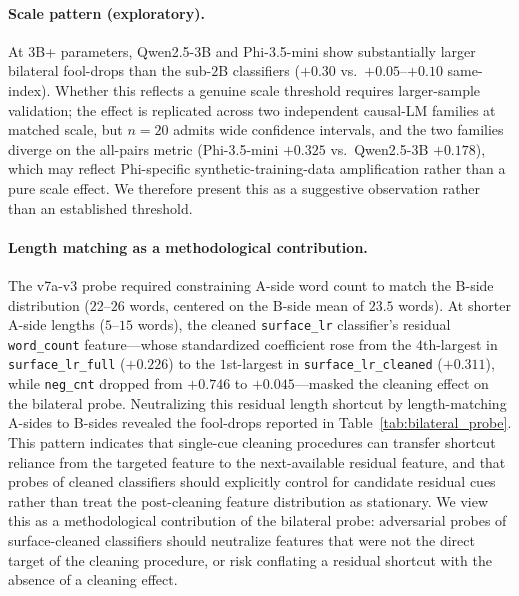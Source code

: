 \paragraph{Scale pattern (exploratory).} At $3$B+ parameters,
Qwen2.5-3B and Phi-3.5-mini show substantially larger bilateral
fool-drops than the sub-$2$B classifiers ($+0.30$ vs.\ $+0.05$--$+0.10$
same-index). Whether this reflects a genuine scale threshold requires
larger-sample validation; the effect is replicated across two
independent causal-LM families at matched scale, but $n=20$ admits
wide confidence intervals, and the two families diverge on the
all-pairs metric (Phi-3.5-mini $+0.325$ vs.\ Qwen2.5-3B $+0.178$),
which may reflect Phi-specific synthetic-training-data amplification
rather than a pure scale effect. We therefore present this as a
suggestive observation rather than an established threshold.

\paragraph{Length matching as a methodological contribution.} The
v7a-v3 probe required constraining A-side word count to match the
B-side distribution ($22$--$26$ words, centered on the B-side mean of
$23.5$ words). At shorter A-side lengths ($5$--$15$ words), the
cleaned \texttt{surface\_lr} classifier's residual \texttt{word\_count}
feature---whose standardized coefficient rose from the $4$th-largest
in \texttt{surface\_lr\_full} ($+0.226$) to the $1$st-largest in
\texttt{surface\_lr\_cleaned} ($+0.311$), while \texttt{neg\_cnt}
dropped from $+0.746$ to $+0.045$---masked the cleaning effect on the
bilateral probe. Neutralizing this residual length shortcut by
length-matching A-sides to B-sides revealed the fool-drops reported
in Table~\ref{tab:bilateral_probe}. This pattern indicates that
single-cue cleaning procedures can transfer shortcut reliance from
the targeted feature to the next-available residual feature, and
that probes of cleaned classifiers should explicitly control for
candidate residual cues rather than treat the post-cleaning
feature distribution as stationary. We view this as a
methodological contribution of the bilateral probe: adversarial
probes of surface-cleaned classifiers should neutralize features that
were not the direct target of the cleaning procedure, or risk
conflating a residual shortcut with the absence of a cleaning effect.




